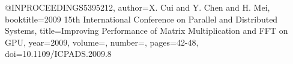 
@INPROCEEDINGS{5395212,  author={X. {Cui} and Y. {Chen} and H. {Mei}},  booktitle={2009 15th International Conference on Parallel and Distributed Systems},   title={Improving Performance of Matrix Multiplication and FFT on GPU},   year={2009},  volume={},  number={},  pages={42-48},  doi={10.1109/ICPADS.2009.8}}
